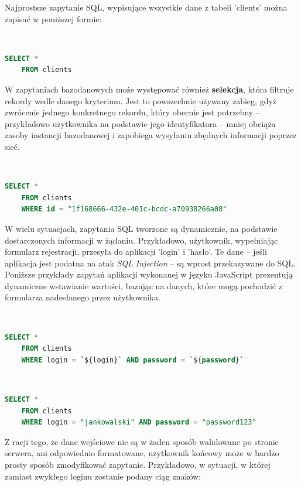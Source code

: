 \documentclass[12pt,twoside]{article}
\begin{document}
Najprostsze zapytanie SQL, wypisujące wszystkie dane z tabeli 'clients' można zapisać w poniższej formie:

\

\begin{lstlisting}[language=SQL,caption=Zwrócenie zawartości tabeli 'clients',label={KodSQL1}]
	SELECT * 
	FROM clients
\end{lstlisting}

W zapytaniach bazodanowych może występować również \textbf{selekcja}, która filtruje rekordy wedle danego kryterium. Jest to powszechnie używany zabieg, gdyż zwrócenie jednego konkretnego rekordu, który obecnie jest potrzebny -- przykładowo użytkownika na podstawie jego identyfikatora -- mniej obciąża zasoby instancji bazodanowej i zapobiega wysyłaniu zbędnych informacji poprzez sieć.

\

\begin{lstlisting}[language=SQL,caption=Zwrócenie rekordu o podanym identyfikatorze z tabeli 'clients',label={KodSQL1}]
	SELECT * 
	FROM clients
	WHERE id = "1f168666-432e-401c-bcdc-a70938266a08"
\end{lstlisting}

W wielu sytuacjach, zapytania SQL tworzone są dynamicznie, na podstawie dostarczonych informacji w żądaniu. Przykładowo, użytkownik, wypełniając formularz rejestracji, przesyła do aplikacji 'login' i 'hasło'. Te dane -- jeśli aplikacja jest podatna na atak \emph{SQL Injection} -- są wprost przekazywane do SQL. Poniższe przykłady zapytań aplikacji wykonanej w języku JavaScript prezentują dynamiczne wstawianie wartości, bazując na danych, które mogą pochodzić z formularza nadesłanego przez użytkownika.

\

\begin{lstlisting}[language=SQL,caption=Kod źródłowy zapytania z selekcją na podstawie danych od użytkownika,label={KodSQL2}]
	SELECT * 
	FROM clients
	WHERE login = `${login}` AND password = `${password}`
\end{lstlisting}

\

\begin{lstlisting}[language=SQL,caption=Zapytanie SQL po wprowadzeniu danych,label={KodSQL3}]
	SELECT * 
	FROM clients
	WHERE login = "jankowalski" AND password = "password123"
\end{lstlisting}

Z racji tego, że dane wejściowe nie są w żaden sposób walidowane po stronie serwera, ani odpowiednio formatowane, użytkownik końcowy może w bardzo prosty sposób zmodyfikować zapytanie. Przykładowo, w sytuacji, w której zamiast zwykłego loginu zostanie podany ciąg znaków: 
\end{document}
